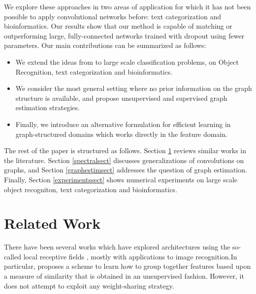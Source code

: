 \documentclass{article} %
\begin{document}
We explore these approaches in two areas of application for which it has not been possible to apply convolutional networks before: text categorization and bioinformatics. Our results show that our method is capable of matching or outperforming large, fully-connected networks trained with dropout using fewer parameters. 
Our main contributions can be summarized as follows:
\begin{itemize}
\item We extend the ideas from \cite{spectralnet2013} to large scale classification problems, on Object Recognition, text categorization and bioinformatics.
\item We consider the most general setting where no prior information on the graph structure is available, and propose unsupervised and supervised graph estimation strategies.
\item Finally, we introduce an alternative formulation for efficient learning in graph-structured domains which works directly in the feature domain.
\end{itemize}

The rest of the paper is structured as follows. Section \ref{relatedworksect} reviews similar works in the literature. Section \ref{spectralsect} discusses generalizations of convolutions on graphs, and Section \ref{graphestimsect} addresses the question of graph estimation. Finally, Section \ref{experimentssect} shows numerical experiments on large scale object recogniton, text categorization and bioinformatics.

\section{Related Work}
\label{relatedworksect}

There have been several works which have explored architectures using the so-called local receptive fields \cite{karol, coates2011selecting, ngiam2010tiled}, mostly with applications to image recognition.In particular, \cite{coates2011selecting} proposes a scheme to learn how to group together features based upon a measure of similarity that is obtained in an unsupervised fashion. However, it does not attempt to exploit any weight-sharing strategy. 
\end{document}
